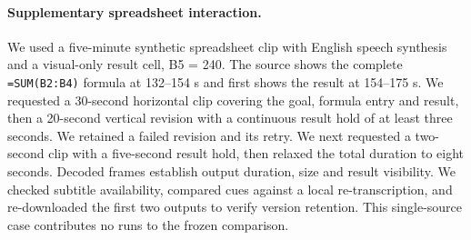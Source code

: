 \paragraph{Supplementary spreadsheet interaction.}
We used a five-minute synthetic spreadsheet clip with English speech synthesis and a visual-only result cell, B5 = 240. The source shows the complete \texttt{=SUM(B2:B4)} formula at 132--154 s and first shows the result at 154--175 s. We requested a 30-second horizontal clip covering the goal, formula entry and result, then a 20-second vertical revision with a continuous result hold of at least three seconds. We retained a failed revision and its retry. We next requested a two-second clip with a five-second result hold, then relaxed the total duration to eight seconds. Decoded frames establish output duration, size and result visibility. We checked subtitle availability, compared cues against a local re-transcription, and re-downloaded the first two outputs to verify version retention. This single-source case contributes no runs to the frozen comparison.

